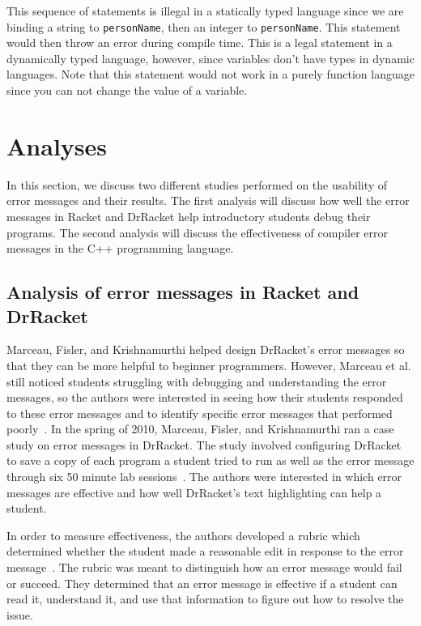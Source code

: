 \documentclass{sig-alternate}
\begin{document}
This sequence of statements is illegal in a statically typed language since we are binding a string to \texttt{personName}, then an integer to \texttt{personName}.
This statement would then throw an error during compile time.
This is a legal statement in a dynamically typed language, however, since variables don't have types in dynamic languages.
Note that this statement would not work in a purely function language since you can not change the value of a variable.


\section{Analyses}\label{sec:analyses}
In this section, we discuss two different studies performed on the usability of error messages and their results.
The first analysis will discuss how well the error messages in Racket and DrRacket help introductory students debug their programs.
The second analysis will discuss the effectiveness of compiler error messages in the C++ programming language. 


\subsection{Analysis of error messages in Racket and DrRacket}\label{subsec:racket analysis}

Marceau, Fisler, and Krishnamurthi helped design DrRacket's error messages so that they can be more helpful to beginner programmers.
However, Marceau et al. still noticed students struggling with debugging and understanding the error messages, so the authors were interested in seeing how their students responded to these error messages and to identify specific error messages that performed poorly~\cite{Marceau:2011:MYL:2048237.2048241}.
In the spring of 2010, Marceau, Fisler, and Krishnamurthi ran a case study on error messages in DrRacket.
The study involved configuring DrRacket to save a copy of each program a student tried to run as well as the error message through six 50 minute lab sessions~\cite{Marceau:2011:MEE:1953163.1953308}.
The authors were interested in which error messages are effective and how well DrRacket's text highlighting can help a student.  

In order to measure effectiveness, the authors developed a rubric which determined whether the student made a reasonable edit in response to the error message~\cite{Marceau:2011:MEE:1953163.1953308}.
The rubric was meant to distinguish how an error message would fail or succeed.
They determined that an error message is effective if a student can read it, understand it, and use that information to figure out how to resolve the issue.
\end{document}
